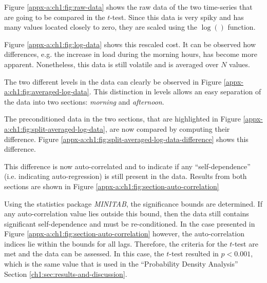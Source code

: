 

Figure \ref{appx-a:ch1:fig:raw-data} shows the raw data of the two time-series that are going to be compared in the $t$-test.
Since this data is very spiky and has many values located closely to zero, they are scaled using the $\log()$ function.



Figure \ref{appx-a:ch1:fig:log-data} shows this rescaled cost.
It can be observed how differences, e.g. the increase in load during the morning hours, has become more apparent.
Nonetheless, this data is still volatile and is averaged over $N$ values.



The two different levels in the data can clearly be observed in Figure \ref{appx-a:ch1:fig:averaged-log-data}.
This distinction in levels allows an easy separation of the data into two sections: \textit{morning} and \textit{afternoon}.



The preconditioned data in the two sections, that are highlighted in Figure \ref{appx-a:ch1:fig:split-averaged-log-data}, are now compared by computing their difference.
Figure \ref{appx-a:ch1:fig:split-averaged-log-data-difference} shows this difference.



This difference is now auto-correlated and to indicate if any ``self-dependence'' (i.e. indicating auto-regression) is still present in the data.
Results from both sections are shown in Figure \ref{appx-a:ch1:fig:section-auto-correlation}



Using the statistics package \textit{MINITAB}, the significance bounds are determined.
If any auto-correlation value lies outside this bound, then the data still contains significant self-dependence and must be re-conditioned.
In the case presented in Figure \ref{appx-a:ch1:fig:section-auto-correlation} however, the auto-correlation indices lie within the bounds for all lags.
Therefore, the criteria for the $t$-test are met and the data can be assessed.
In this case, the $t$-test resulted in $p<0.001$, which is the same value that is used in the ``Probability Density Analysis'' Section \ref{ch1:sec:results-and-discussion}.





